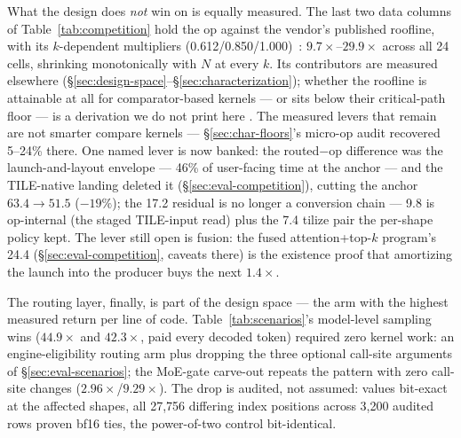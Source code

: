 What the design does \emph{not} win on is equally measured. The last
two data columns of Table~\ref{tab:competition} hold the op against the
vendor's published roofline, with its $k$-dependent multipliers
(0.612/0.850/1.000)~\cite{ttllmperf2026}:
$9.7\times$--$29.9\times$ across all 24 cells, shrinking monotonically
with $N$ at every $k$. Its contributors are measured elsewhere
(\S\ref{sec:design-space}--\S\ref{sec:characterization}); whether the
roofline is attainable at all for comparator-based kernels --- or sits
below their critical-path floor --- is a derivation we do not print
here . The measured
levers that remain are not smarter compare kernels ---
\S\ref{sec:char-floors}'s micro-op audit recovered 5--24\% there.
One named lever is now banked: the routed$-$op difference
was the launch-and-layout envelope --- 46\% of user-facing time at the
anchor --- and the TILE-native landing deleted it
(\S\ref{sec:eval-competition}), cutting the anchor $63.4 \to 51.5$\us{}
($-19\%$); the 17.2\us{} residual is no longer a conversion chain ---
9.8\us{} is op-internal (the staged TILE-input read) plus the 7.4\us{}
tilize pair the per-shape policy kept. The lever still open is
fusion: the fused attention+top-$k$ program's 24.4\us{}
(\S\ref{sec:eval-competition}, caveats there) is the existence proof
that amortizing the launch into the producer buys the next
$1.4\times$.

The routing layer, finally, is part of the design space --- the arm
with the highest measured return per line of code. Table~\ref{tab:scenarios}'s model-level sampling wins
($44.9\times$ and $42.3\times$, paid every decoded token) required zero
kernel work: an engine-eligibility routing arm plus dropping the three
optional call-site arguments of \S\ref{sec:eval-scenarios}; the MoE-gate
carve-out repeats the pattern with zero call-site changes
($2.96\times$/$9.29\times$). The drop is
audited, not assumed: values bit-exact at the affected shapes, all
27,756 differing index positions across 3,200 audited rows proven bf16
ties, the power-of-two control bit-identical.
